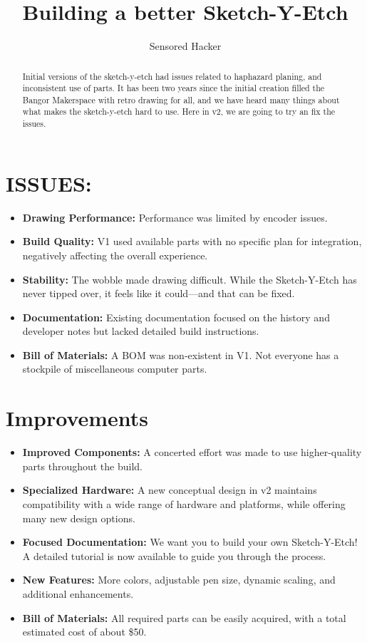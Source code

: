 \documentclass[]{article}
\title{Building a better Sketch-Y-Etch}
\author{Sensored Hacker}
\begin{document}
\maketitle

\begin{abstract}
Initial versions of the sketch-y-etch had issues related to haphazard planing, and inconsistent use of parts. It has been two years since the initial creation filled the Bangor Makerspace with retro drawing for all, and we have heard many things about 
what makes the sketch-y-etch hard to use. Here in v2, we are going to try an fix the issues. 
\end{abstract}

\section*{ISSUES:}
\begin{itemize}
	\item \textbf{Drawing Performance:} Performance was limited by encoder issues.
	\item \textbf{Build Quality:} V1 used available parts with no specific plan for integration, negatively affecting the overall experience.
	\item \textbf{Stability:} The wobble made drawing difficult. While the Sketch-Y-Etch has never tipped over, it feels like it could—and that can be fixed.
	\item \textbf{Documentation:} Existing documentation focused on the history and developer notes but lacked detailed build instructions.
	\item \textbf{Bill of Materials:} A BOM was non-existent in V1. Not everyone has a stockpile of miscellaneous computer parts.
\end{itemize}

\section*{Improvements}

\begin{itemize}
	\item \textbf{Improved Components:} A concerted effort was made to use higher-quality parts throughout the build.
	\item \textbf{Specialized Hardware:} A new conceptual design in v2 maintains compatibility with a wide range of hardware and platforms, while offering many new design options.
	\item \textbf{Focused Documentation:} We want you to build your own Sketch-Y-Etch! A detailed tutorial is now available to guide you through the process.
	\item \textbf{New Features:} More colors, adjustable pen size, dynamic scaling, and additional enhancements.
	\item \textbf{Bill of Materials:} All required parts can be easily acquired, with a total estimated cost of about \$50.
\end{itemize}
\end{document}
